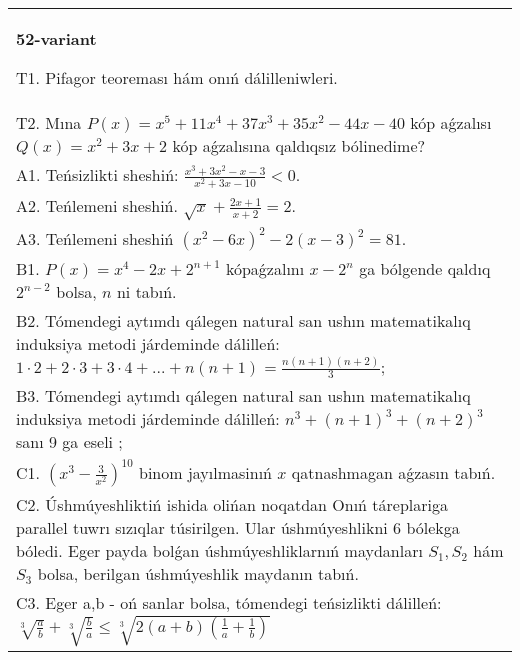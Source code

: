 \documentclass{article}
\begin{document}
\begin{tabular}{m{17cm}}
\textbf{52-variant}
\newline

T1. Pifagor teoreması hám onıń dálilleniwleri. \\
T2. Mına \(P(x) = x^{5} + 11x^{4} + 37x^{3} + 35x^{2} - 44x - 40\) kóp aǵzalısı \(Q(x) = x^{2} + 3x + 2\) kóp aǵzalısına qaldıqsız bólinedime? \\
A1. Teńsizlikti sheshiń: \(\frac{x^{3} + 3x^{2} - x - 3}{x^{2} + 3x - 10} < 0\). \\
A2. Teńlemeni sheshiń. \(\sqrt{x} + \frac{2x + 1}{x + 2} = 2\). \\
A3. Teńlemeni sheshiń \(\left( x^{2} - 6x \right)^{2} - 2(x - 3)^{2} = 81\). \\
B1. \(P(x) = x^{4} - 2x + 2^{n + 1}\) kópaǵzalını \(x - 2^{n}\) ga bólgende qaldıq \(2^{n - 2}\) bolsa, \(n\) ni tabıń. \\
B2. Tómendegi aytımdı qálegen natural san ushın matematikalıq induksiya metodi járdeminde dálilleń: \(1 \cdot 2 + 2 \cdot 3 + 3 \cdot 4 + ... + n(n + 1) = \frac{n(n + 1)(n + 2)}{3}\); \\
B3. Tómendegi aytımdı qálegen natural san ushın matematikalıq induksiya metodi járdeminde dálilleń: \(n^{3} + (n + 1)^{3} + (n + 2)^{3}\) sanı 9 ga eseli ; \\
C1. \(\left( x^{3} - \frac{3}{x^{2}} \right)^{10}\) binom jayılmasinıń \(x\) qatnashmagan aǵzasın tabıń. \\
C2. Úshmúyeshliktiń ishida olińan noqatdan Onıń táreplariga parallel tuwrı sızıqlar túsirilgen. Ular úshmúyeshlikni 6 bólekga bóledi. Eger payda bolǵan úshmúyeshliklarnıń maydanları \(S_{1},S_{2}\) hám \(S_{3}\) bolsa, berilgan úshmúyeshlik maydanın tabıń. \\
C3. Eger a,b - oń sanlar bolsa, tómendegi teńsizlikti dálilleń: \(\sqrt[3]{\frac{a}{b}} + \sqrt[3]{\frac{b}{a}} \leq \sqrt[3]{2(a + b)\left( \frac{1}{a} + \frac{1}{b} \right)}\) \\

\end{tabular}
\vspace{1cm}
\end{document}
